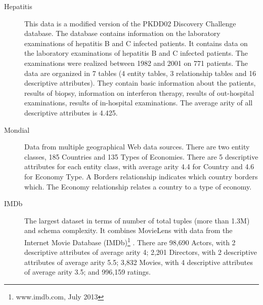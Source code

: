 \documentclass[runningheads,a4paper]{llncs}
\begin{document}
\begin{description}
\item[Hepatitis] This data is a modified version of the PKDD02 Discovery Challenge database. %
The database contains information on the laboratory examinations of hepatitis B and C infected patients. It contains data on the laboratory examinations
of hepatitis B and C infected patients. The examinations were realized between 1982 and 2001 on 771 patients. The data are organized in 7 tables (4 entity tables,  3 relationship tables and 16 descriptive attributes). They contain basic information about the patients, results of biopsy, information on interferon therapy, results of out-hospital examinations, results of in-hospital examinations. The average arity of all descriptive attributes is 4.425.

\item[Mondial] Data from multiple geographical Web data sources. There are two entity classes, 185 Countries and 135 Types of Economies. There are 5 descriptive attributes for each entity class, with average arity 4.4 for Country and 4.6 for Economy Type. A Borders relationship indicates which country borders which. The Economy relationship relates a country to a type of economy.

\item[IMDb] %
The largest dataset in terms of number of total tuples (more than 1.3M) and schema complexity. %
It combines MovieLens %
with data from the Internet Movie Database (IMDb)\footnote{www.imdb.com, July 2013} \cite{Peralta2007}. There are 98,690 Actors, with 2 descriptive attributes of average arity 4;  2,201 Directors, with 2 descriptive attributes of average arity 5.5; 3,832 Movies, with 4 descriptive attributes of average arity 3.5; and 996,159 ratings. 
\end{description}
\end{document}
